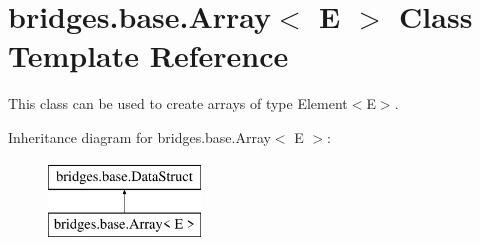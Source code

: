 \hypertarget{classbridges_1_1base_1_1_array}{}\section{bridges.\+base.\+Array$<$ E $>$ Class Template Reference}
\label{classbridges_1_1base_1_1_array}


This class can be used to create arrays of type Element$<$\+E$>$.  


Inheritance diagram for bridges.\+base.\+Array$<$ E $>$\+:\begin{figure}[H]
\begin{center}
\leavevmode
\includegraphics[height=2.000000cm]{classbridges_1_1base_1_1_array}
\end{center}
\end{figure}
